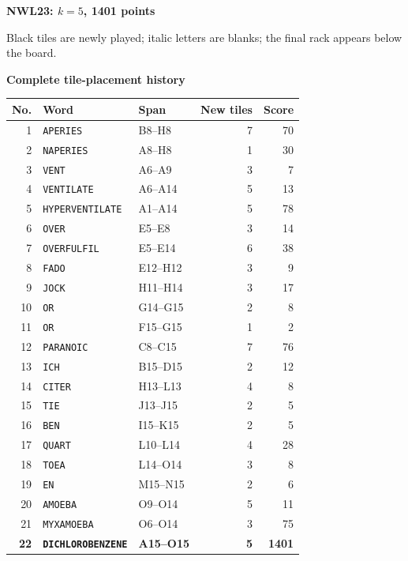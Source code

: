 \documentclass[letterpaper]{article}
\begin{document}
\vfill
\clearpage
\begin{center}
{\fontsize{11}{12}\selectfont\bfseries NWL23: $k=5$, 1401 points\par}
\vspace{2pt}
\par
\vspace{1pt}
{\fontsize{7.2}{8}\selectfont Black tiles are newly played; italic letters are blanks; the final rack appears below the board.\par}
\vspace{2pt}
{\fontsize{8.5}{9}\selectfont\bfseries Complete tile-placement history\par}
\end{center}
\begin{center}
\fontsize{8}{8.3}\selectfont
\setlength{\tabcolsep}{4pt}
\renewcommand{\arraystretch}{0.84}
\begin{tabular}{@{}rllrr@{}}\toprule
No. & Word & Span & New tiles & Score\\
\midrule
1 & \texttt{APERIES} & B8--H8 & 7 & 70\\
2 & \texttt{NAPERIES} & A8--H8 & 1 & 30\\
3 & \texttt{VENT} & A6--A9 & 3 & 7\\
4 & \texttt{VENTILATE} & A6--A14 & 5 & 13\\
5 & \texttt{HYPERVENTILATE} & A1--A14 & 5 & 78\\
6 & \texttt{OVER} & E5--E8 & 3 & 14\\
7 & \texttt{OVERFULFIL} & E5--E14 & 6 & 38\\
8 & \texttt{FADO} & E12--H12 & 3 & 9\\
9 & \texttt{JOCK} & H11--H14 & 3 & 17\\
10 & \texttt{OR} & G14--G15 & 2 & 8\\
11 & \texttt{OR} & F15--G15 & 1 & 2\\
12 & \texttt{PARANOIC} & C8--C15 & 7 & 76\\
13 & \texttt{ICH} & B15--D15 & 2 & 12\\
14 & \texttt{CITER} & H13--L13 & 4 & 8\\
15 & \texttt{TIE} & J13--J15 & 2 & 5\\
16 & \texttt{BEN} & I15--K15 & 2 & 5\\
17 & \texttt{QUART} & L10--L14 & 4 & 28\\
18 & \texttt{TOEA} & L14--O14 & 3 & 8\\
19 & \texttt{EN} & M15--N15 & 2 & 6\\
20 & \texttt{AMOEBA} & O9--O14 & 5 & 11\\
21 & \texttt{MYXAMOEBA} & O6--O14 & 3 & 75\\
\midrule
\textbf{22} & \textbf{\texttt{DICHLOROBENZENE}} & \textbf{A15--O15} & \textbf{5} & \textbf{1401}\\
\bottomrule\end{tabular}
\end{center}
\end{document}
